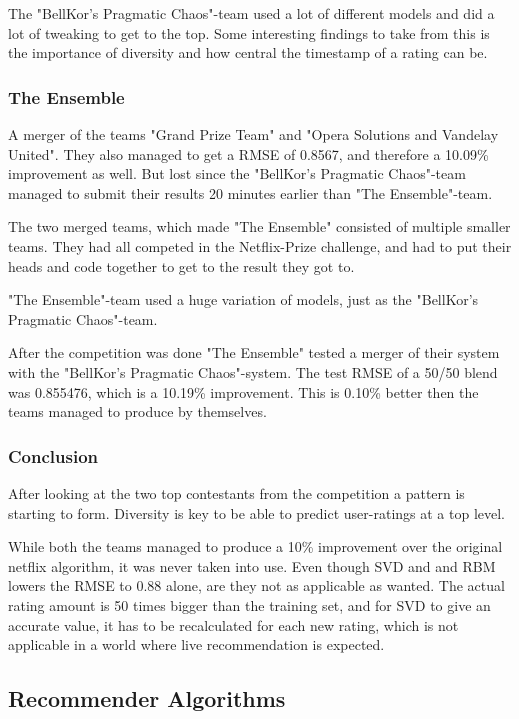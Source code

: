 The "BellKor's Pragmatic Chaos"-team used a lot of different models and did a lot of tweaking to get to the top. Some interesting findings to take from this is the importance of diversity and how central the timestamp of a rating can be.

\subsubsection{The Ensemble}

A merger of the teams "Grand Prize Team" and "Opera Solutions and Vandelay United". They also managed to get a RMSE of 0.8567, and therefore a 10.09\% improvement as well. But lost since the "BellKor's Pragmatic Chaos"-team managed to submit their results 20 minutes earlier than "The Ensemble"-team.

The two merged teams, which made "The Ensemble" consisted of multiple smaller teams. They had all competed in the Netflix-Prize challenge, and had to put their heads and code together to get to the result they got to.

"The Ensemble"-team used a huge variation of models, just as the "BellKor's Pragmatic Chaos"-team.

After the competition was done "The Ensemble" tested a merger of their system with the "BellKor's Pragmatic Chaos"-system. The test RMSE of a 50/50 blend was 0.855476, which is a 10.19\% improvement. This is 0.10\% better then the teams managed to produce by themselves.

\subsubsection{Conclusion}
After looking at the two top contestants from the competition a pattern is starting to form. Diversity is key to be able to predict user-ratings at a top level.

While both the teams managed to produce a 10\% improvement over the original netflix algorithm, it was never taken into use\cite{nfbeyond5}. Even though SVD and and RBM lowers the RMSE to 0.88 alone, are they not as applicable as wanted. The actual rating amount is 50 times bigger than the training set, and for SVD to give an accurate value, it has to be recalculated for each new rating, which is not applicable in a world where live recommendation is expected\cite{nfbeyond5}.


\subsection{Recommender Algorithms}
